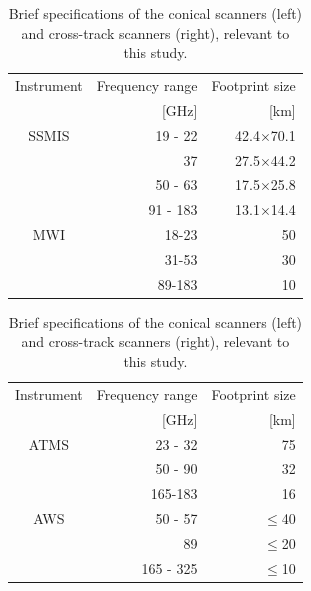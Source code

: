\documentclass[12pt,oneside,a4paper]{article}
\begin{document}
\begin{table}[!t]
	\footnotesize
	\centering
	\caption{Brief specifications of the conical scanners (left) and cross-track scanners (right), relevant to this study.}
	\label{tab:specifications_instruments}	
	\parbox{.45\linewidth}{
	\centering
	\begin{tabular}{crr}
	\toprule
		Instrument & Frequency range 	& Footprint size \\
					& [GHz]             & [km]     \\
		\midrule			
		SSMIS	   &19 - 22		& 42.4$\times$70.1	\\
				   &37          &27.5$\times$44.2  \\
				   &50 - 63       & 17.5$\times$25.8 \\
				   &91 - 183    &  13.1$\times$14.4\\
		\midrule
		MWI 	   &18-23 		&50\\
				   &31-53 		& 30\\
				   & 89-183 	& 10\\	
		\bottomrule		
	\end{tabular}
	}
\hfill
\parbox{.45\linewidth}{
	\centering
	\begin{tabular}{crr}
	\toprule
	Instrument & Frequency range 	& Footprint size \\
	& [GHz]             & [km]       \\
	\midrule			
	ATMS	    &23 - 32		& 75	\\
				&50 - 90        &32  \\
				&165-183        & 16 \\
	\midrule
	AWS 	   &50 - 57 		& $\le$40\\
			   &89 				& $\le$20\\
			   & 165 - 325 		& $\le$10\\	
	\bottomrule		
\end{tabular}
}
\end{table}
\end{document}
